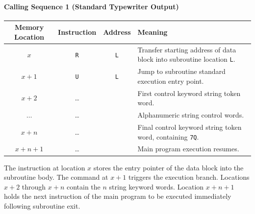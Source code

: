\paragraph{Calling Sequence 1 (Standard Typewriter Output)}
\begin{table}[h!]
\centering
\begin{tabularx}{\textwidth}{cccX}
\toprule
\textbf{Memory Location} & \textbf{Instruction} & \textbf{Address} & \textbf{Meaning} \\
\midrule
$x$     & \texttt{R} & \texttt{L} & Transfer starting address of data block into subroutine location \texttt{L}. \\
$x+1$   & \texttt{U} & \texttt{L} & Jump to subroutine standard execution entry point. \\
$x+2$   & \dots      &             & First control keyword string token word. \\
$\dots$ & \dots      &             & Alphanumeric string control words. \\
$x+n$   & \dots      &             & Final control keyword string token word, containing \texttt{7Q}. \\
$x+n+1$ & \dots      &             & Main program execution resumes. \\
\bottomrule
\end{tabularx}
\end{table}
The instruction at location $x$ stores the entry pointer of the data block into the subroutine body. The command at $x+1$ triggers the execution branch. Locations $x+2$ through $x+n$ contain the $n$ string keyword words. Location $x+n+1$ holds the next instruction of the main program to be executed immediately following subroutine exit.

